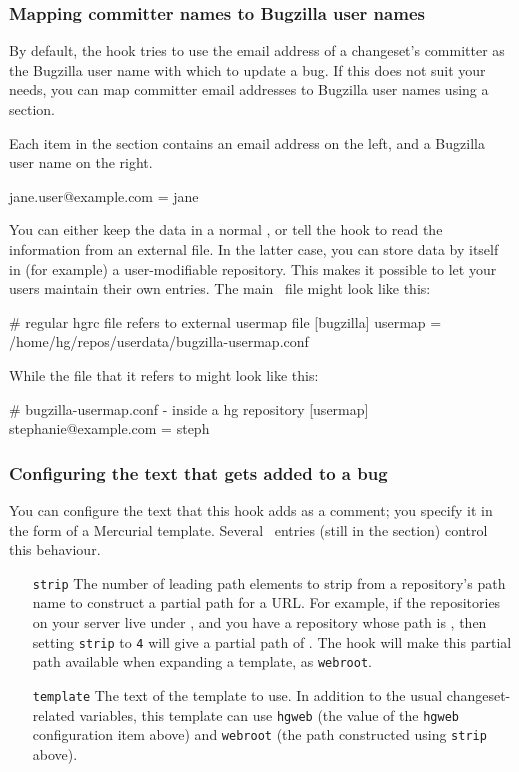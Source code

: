 \subsubsection{Mapping committer names to Bugzilla user names}

By default, the  hook tries to use the email address
of a changeset's committer as the Bugzilla user name with which to
update a bug.  If this does not suit your needs, you can map committer
email addresses to Bugzilla user names using a 
section.

Each item in the  section contains an email address
on the left, and a Bugzilla user name on the right.
\begin{codesample2}
  [usermap]
  jane.user@example.com = jane
\end{codesample2}
You can either keep the  data in a normal \hgrc, or
tell the  hook to read the information from an
external  file.  In the latter case, you can store
 data by itself in (for example) a user-modifiable
repository.  This makes it possible to let your users maintain their
own  entries.  The main \hgrc\ file might
look like this:
\begin{codesample2}
  # regular hgrc file refers to external usermap file
  [bugzilla]
  usermap = /home/hg/repos/userdata/bugzilla-usermap.conf
\end{codesample2}
While the  file that it refers to might look like
this:
\begin{codesample2}
  # bugzilla-usermap.conf - inside a hg repository
  [usermap]
  stephanie@example.com = steph
\end{codesample2}

\subsubsection{Configuring the text that gets added to a bug}

You can configure the text that this hook adds as a comment; you
specify it in the form of a Mercurial template.  Several \hgrc\
entries (still in the  section) control this
behaviour.
\begin{itemize}
\item[\texttt{strip}] The number of leading path elements to strip
  from a repository's path name to construct a partial path for a URL.
  For example, if the repositories on your server live under
  , and you have a repository whose path is
  \dirname{/home/hg/repos/app/tests}, then setting \texttt{strip} to
  \texttt{4} will give a partial path of \dirname{app/tests}.  The
  hook will make this partial path available when expanding a
  template, as \texttt{webroot}.
\item[\texttt{template}] The text of the template to use.  In addition
  to the usual changeset-related variables, this template can use
  \texttt{hgweb} (the value of the \texttt{hgweb} configuration item
  above) and \texttt{webroot} (the path constructed using
  \texttt{strip} above).
\end{itemize}

